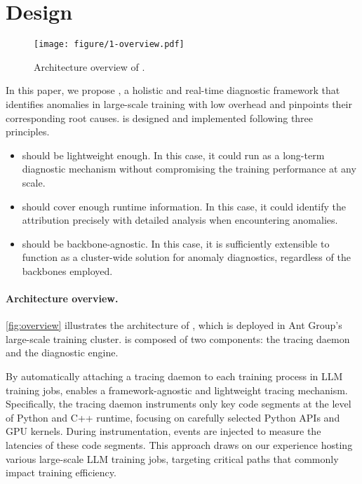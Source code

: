 \section{\sysname{} Design}
\begin{figure}
    \centering
    \texttt{[image: figure/1-overview.pdf]}
    \caption{Architecture overview of \sysname{}.}
    \label{fig:overview}
    \vspace{-4mm}
\end{figure}


In this paper, we propose \sysname{}, a holistic and real-time diagnostic framework that identifies anomalies in large-scale training with low overhead and pinpoints their corresponding root causes.
\sysname{} is designed and implemented following three principles.
\begin{itemize}
[leftmargin=*,topsep=0.2em,itemsep=-0.2em]
    \item \sysname{} should be lightweight enough. In this case, it could run as a long-term diagnostic mechanism without compromising the training performance at any scale.   
    \item \sysname{} should cover enough runtime information. In this case, it could identify the attribution precisely with detailed analysis when encountering anomalies.
    \item \sysname{} should be backbone-agnostic. In this case, it is sufficiently extensible to function as a cluster-wide solution for anomaly diagnostics, regardless of the backbones employed.
\end{itemize}


\paragraph{Architecture overview.}

\autoref{fig:overview} illustrates the architecture of \sysname{}, which is deployed in Ant Group’s large-scale training cluster. \sysname{} is composed of two components: the tracing daemon and the diagnostic engine. 

By automatically attaching a tracing daemon to each training process in LLM training jobs, \sysname{} enables a framework-agnostic and lightweight tracing mechanism.
Specifically, the tracing daemon instruments only key code segments at the level of Python and C++ runtime, focusing on carefully selected Python APIs and GPU kernels.
During instrumentation, events are injected to measure the latencies of these code segments.
This approach draws on our experience hosting various large-scale LLM training jobs, targeting critical paths that commonly impact training efficiency.

